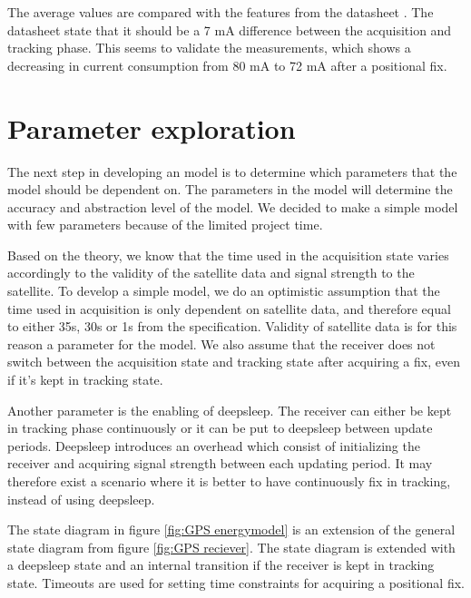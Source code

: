 The average values are compared with the features from the datasheet \cite{L76}. The datasheet state that it should be a 7 mA difference between the acquisition and tracking phase. This seems to validate the measurements, which shows a decreasing in current consumption from 80 mA to 72 mA after a positional fix.   
\section{Parameter exploration}
The next step in developing an model is to determine which parameters that the model should be dependent on. The parameters in the model will determine the accuracy and abstraction level of the model. We decided to make a simple model with few parameters because of the limited project time.

Based on the theory, we know that the time used in the acquisition state varies accordingly to the validity of the satellite data and signal strength to the satellite. To develop a simple model, we do an optimistic assumption that the time used in acquisition is only dependent on satellite data, and therefore equal to either 35s, 30s or 1s from the specification\cite{L76}. Validity of satellite data is for this reason a parameter for the model. We also assume that the receiver does not switch between the acquisition state and tracking state after acquiring a fix, even if it's kept in tracking state. 

Another parameter is the enabling of deepsleep. The receiver can either be kept in tracking phase continuously or it can be put to deepsleep between update periods. Deepsleep introduces an overhead which consist of initializing the receiver and acquiring signal strength between each updating period. It may therefore exist a scenario where it is better to have continuously fix in tracking, instead of using deepsleep. 

The state diagram in figure \ref{fig:GPS energymodel} is an extension of the general state diagram from figure \ref{fig:GPS reciever}. The state diagram is extended with a deepsleep state and an internal transition if the receiver is kept in tracking state. Timeouts are used for setting time constraints for acquiring a positional fix. 

